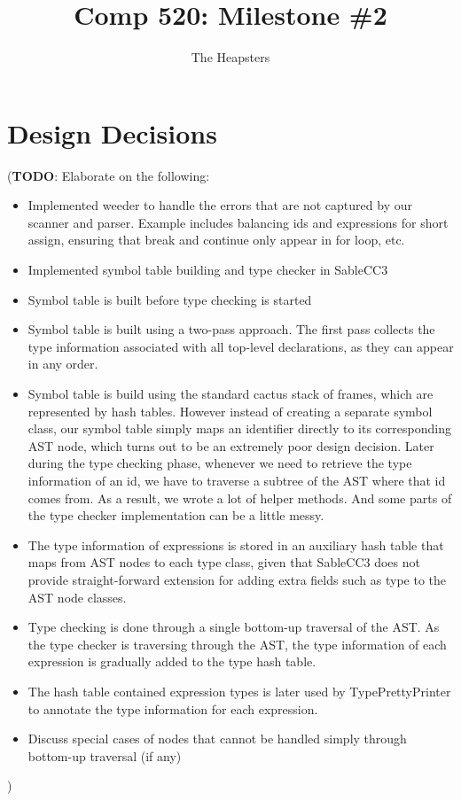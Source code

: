 \documentclass{article}
\title{Comp 520: Milestone \#2}
\author{The Heapsters}
\date{}
\begin{document}
\maketitle

\section*{Design Decisions}

(\textbf{TODO}: Elaborate on the following:

\begin{itemize}
\item Implemented weeder to handle the errors that are not captured by our scanner and parser. Example includes balancing ids and expressions for short assign, ensuring that break and continue only appear in for loop, etc.
\item Implemented symbol table building and type checker in SableCC3
\item Symbol table is built before type checking is started
\item Symbol table is built using a two-pass approach. The first pass collects the type information associated with all top-level declarations, as they can appear in any order.
\item Symbol table is build using the standard cactus stack of frames, which are represented by hash tables. However instead of creating a separate symbol class, our symbol table simply maps an identifier directly to its corresponding AST node, which turns out to be an extremely poor design decision. Later during the type checking phase, whenever we need to retrieve the type information of an id, we have to traverse a subtree of the AST where that id comes from. As a result, we wrote a lot of helper methods. And some parts of the type checker implementation can be a little messy.
\item The type information of expressions is stored in an auxiliary hash table that maps from AST nodes to each type class, given that SableCC3 does not provide straight-forward extension for adding extra fields such as type to the AST node classes.
\item Type checking is done through a single bottom-up traversal of the AST. As the type checker is traversing through the AST, the type information of each expression is gradually added to the type hash table.
\item The hash table contained expression types is later used by TypePrettyPrinter to annotate the type information for each expression.
\item Discuss special cases of nodes that cannot be handled simply through bottom-up traversal (if any)
\end{itemize}
)
\end{document}
